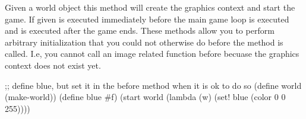
\newline
{}

Given a world object this method will create the graphics context and start the game. If given  is executed immediately before the main game loop is executed and  is executed after the game ends. These methods allow you to perform arbitrary initialization that you could not otherwise do before the  method is called. I.e, you cannot call an image related function before  becuase the graphics context does not exist yet.

\begin{schemedisplay}
;; define blue, but set it in the before method when it is ok to do so
(define world (make-world))
(define blue #f)
(start world (lambda (w) (set! blue (color 0 0 255))))
\end{schemedisplay}


